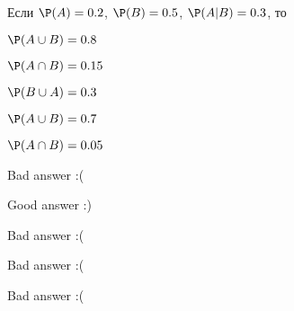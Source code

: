 
\begin{question}
Если \(\P(A)=0.2\), \(\P(B)=0.5\), \(\P(A | B) = 0.3\), то
\begin{answerlist}
  \item \(\P(A \cup B) = 0.8\)
  \item \(\P(A \cap B) = 0.15\)
  \item \(\P(B \cup A) = 0.3\)
  \item \(\P(A \cup B) = 0.7\)
  \item \(\P(A \cap B) = 0.05\)
\end{answerlist}
\end{question}

\begin{solution}
\begin{answerlist}
  \item Bad answer :(
  \item Good answer :)
  \item Bad answer :(
  \item Bad answer :(
  \item Bad answer :(
\end{answerlist}
\end{solution}

